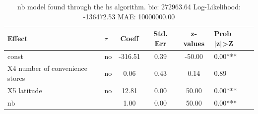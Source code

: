\begin{table}
	\caption{nb model found through the hs algorithm. bic: 272963.64 Log-Likelihood: -136472.53 MAE: 10000000.00}
	\begin{center}
		\begin{tabular}{|l|l|c|c|c|l|}
			\hline
			Effect & $\tau$ & Coeff & Std. Err & z-values & Prob |z|>Z \\
			\hline
			const & no & -316.51 & 0.39 & -50.00 & 0.00*** \\
			\hline
			X4 number of convenience stores & no & 0.06 & 0.43 & 0.14 & 0.89 \\
			\hline
			X5 latitude & no & 12.81 & 0.00 & 50.00 & 0.00*** \\
			\hline
			nb &  & 1.00 & 0.00 & 50.00 & 0.00*** \\
			\hline
		\end{tabular}
	\end{center}
\end{table}